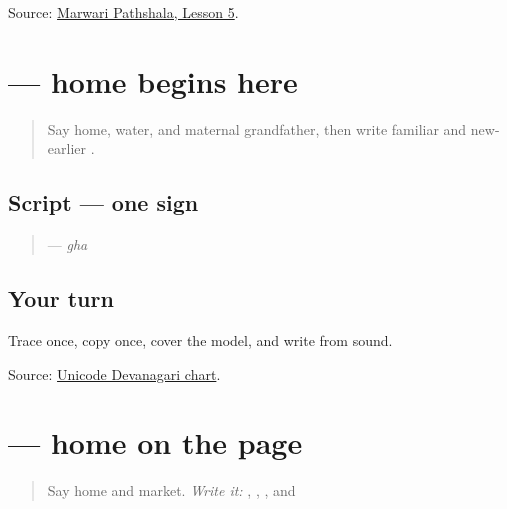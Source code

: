 \begin{tcolorbox}[breakable,colback=teal!4,colframe=teal!35!black,title={Before you move on}]
Source: \href{https://www.marwaripathshala.com/marwari-lesson-5-english}{Marwari Pathshala, Lesson 5}.
\end{tcolorbox}
\section[\texorpdfstring{\mw{घ} (gha)}{घ (gha)}]{ — home begins here}

\label{lesson:MW-W10-gha}



\begin{quote}
Say home, water, and maternal grandfather, then write familiar \textbf{} and new-earlier \textbf{}.
\end{quote}

\subsection*{Script — one sign}

\begin{quote}
\textbf{} — \emph{gha}
\end{quote}

\subsection*{Your turn}
Trace once, copy once, cover the model, and write \textbf{} from sound.

\begin{tcolorbox}[breakable,colback=teal!4,colframe=teal!35!black,title={Before you move on}]
Source: \href{https://www.unicode.org/charts/PDF/U0900.pdf}{Unicode Devanagari chart}.
\end{tcolorbox}
\section[\texorpdfstring{\mw{घर} (ghar)}{घर (ghar)}]{ — home on the page}

\label{lesson:MW-C10-ghar}



\begin{quote}
Say home and market. \emph{Write it:} \textbf{}, \textbf{}, \textbf{}, and \textbf{}
\end{quote}


